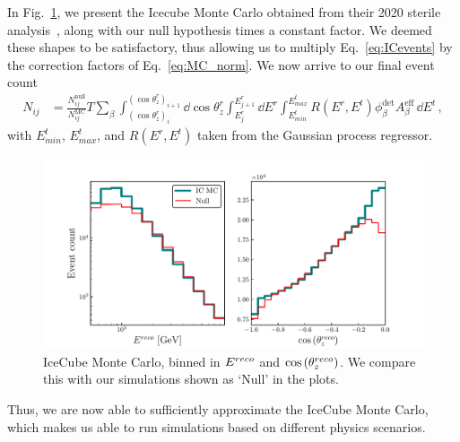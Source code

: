 In Fig.~\ref{fig:IC_MC_norm}, we present the Icecube Monte Carlo obtained from their 2020 sterile analysis~\cite{IC2020}, along
with our null hypothesis times a constant factor.  We deemed these shapes to be satisfactory, thus allowing us to multiply Eq.~\ref{eq:ICevents} by the 
correction factors of Eq.~\ref{eq:MC_norm}. We now arrive to our final event count
\begin{align}\label{eq:Nth}
    N_{ij} &= \frac{N_{ij}^\text{null}}{N_{ij}^\text{MC}} T \sum_\beta \int_{(\cos{\theta_z^r})_i}^{(\cos{\theta_z^r})_{i+1}} \dd \cos{\theta^r_z} \int_{E^r_{j}}^{E^r_{j+1}} \dd E^r 
    \int_{E^t_{min}}^{E^t_{max}} R(E^r,E^t) \phi_\beta^\text{det}  A^\text{eff}_\beta\, \dd E^t
    \,,
\end{align}
with $E^t_{min}$, $E^t_{max}$, and $R(E^r,E^t)$ taken from the Gaussian process regressor.
\begin{figure}
    \centering
    \includegraphics[width=0.8\linewidth]{figures/IC_MC_norm.pdf}
    \caption{IceCube Monte Carlo, binned in $E^{reco}$ and $\cos{(\theta_z^{reco})}$. We compare this with our simulations shown as `Null' in the plots.}\label{fig:IC_MC_norm}
\end{figure} 
Thus, we are now able to sufficiently approximate the IceCube Monte Carlo, which makes us able to run simulations based on different physics scenarios.
% 
% 
% 